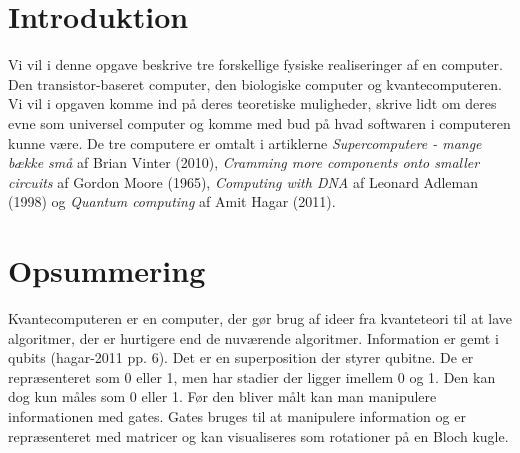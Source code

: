 \documentclass{article}
\begin{document}
\section{Introduktion}
Vi vil i denne opgave beskrive tre forskellige fysiske realiseringer af en computer. Den transistor-baseret computer, den biologiske computer og kvantecomputeren. Vi vil i opgaven komme ind på deres teoretiske muligheder, skrive lidt om deres evne som universel computer og komme med bud på hvad softwaren i computeren kunne være. De tre computere er omtalt i artiklerne { \it Supercomputere - mange bække små} af Brian Vinter (2010), { \it Cramming more components onto smaller circuits} af Gordon Moore (1965), { \it Computing with DNA} af Leonard Adleman (1998) og { \it Quantum computing} af Amit Hagar (2011).

\section{Opsummering}
Kvantecomputeren er en computer, der gør brug af ideer fra kvanteteori til at lave algoritmer, der er hurtigere end de nuværende algoritmer. Information er gemt i qubits (hagar-2011 pp. 6). Det er en superposition der styrer qubitne. De er repræsenteret som 0 eller 1, men har stadier der ligger imellem 0 og 1. Den kan dog kun måles som 0 eller 1. Før den bliver målt kan man manipulere informationen med gates. Gates bruges til at manipulere information og er repræsenteret med matricer og kan visualiseres som rotationer på en Bloch kugle.
\end{document}
